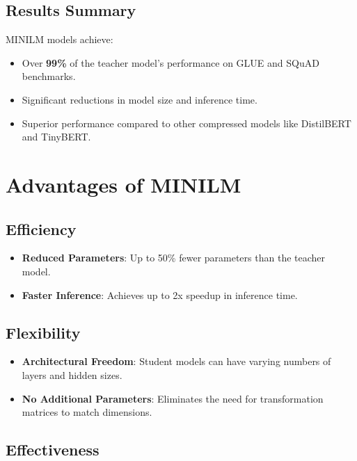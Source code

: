 \documentclass{article}
\begin{document}
\subsection{Results Summary}  
  
MINILM models achieve:  
  
\begin{itemize}  
    \item Over \textbf{99\%} of the teacher model's performance on GLUE and SQuAD benchmarks.  
    \item Significant reductions in model size and inference time.  
    \item Superior performance compared to other compressed models like DistilBERT and TinyBERT.  
\end{itemize}  
  
\section{Advantages of MINILM}  
  
\subsection{Efficiency}  
  
\begin{itemize}  
    \item \textbf{Reduced Parameters}: Up to 50\% fewer parameters than the teacher model.  
    \item \textbf{Faster Inference}: Achieves up to 2x speedup in inference time.  
\end{itemize}  
  
\subsection{Flexibility}  
  
\begin{itemize}  
    \item \textbf{Architectural Freedom}: Student models can have varying numbers of layers and hidden sizes.  
    \item \textbf{No Additional Parameters}: Eliminates the need for transformation matrices to match dimensions.  
\end{itemize}  
  
\subsection{Effectiveness}  
  
\end{document}
